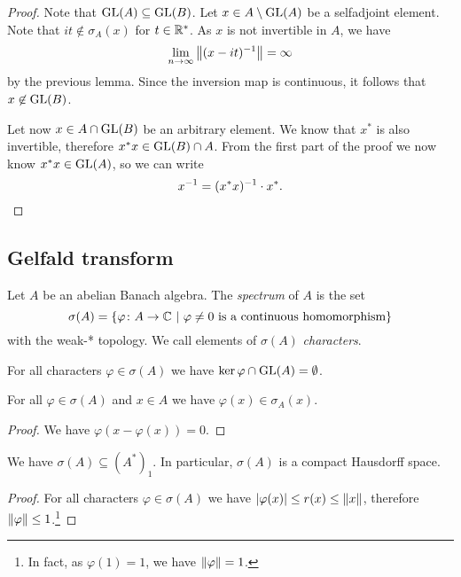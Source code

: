 \begin{proof}
Note that $\operatorname{GL}(A) \subseteq \operatorname{GL}(B)$. Let $x \in A \setminus \operatorname{GL}(A)$
be a selfadjoint element. Note that $it \not \in \sigma_A(x)$ for
$t \in \mathbb{R}^*$. As $x$ is not invertible in $A$, we have
\[
\lim_{n \to \infty} \left\lVert (x - it)^{-1}\right\rVert = \infty
\]
by the previous lemma. Since the inversion map is continuous, it
follows that $x \not \in \operatorname{GL}(B)$.

Let now $x \in A \cap \operatorname{GL}(B)$ be an arbitrary element. We know that
$x^*$ is also invertible, therefore $x^* x \in \operatorname{GL}(B) \cap A$. From
the first part of the proof we now know $x^* x \in \operatorname{GL}(A)$, so
we can write
\[
x^{-1} = (x^* x)^{-1} \cdot x^*. \qedhere
\]
\end{proof}

\newpage

\subsection{Gelfald transform}

\begin{definicija}
Let $A$ be an abelian Banach algebra. The
\emph{spectrum} of $A$ is the set
\[
\sigma(A) =
\left\{\varphi \colon A \to \mathbb{C}~\middle\vert~\text{$\varphi \ne 0$ is a continuous homomorphism}\right\}
\]
with the weak-* topology. We call elements of $\sigma(A)$
\emph{characters}.
\end{definicija}

\begin{opomba}
For all characters $\varphi \in \sigma(A)$ we have
$\ker \varphi \cap \operatorname{GL}(A) = \emptyset$.
\end{opomba}

\begin{trditev}
For all $\varphi \in \sigma(A)$ and $x \in A$ we have
$\varphi(x) \in \sigma_A(x)$.
\end{trditev}

\begin{proof}
We have $\varphi(x - \varphi(x)) = 0$.
\end{proof}

\begin{posledica}
We have $\sigma(A) \subseteq (A^*)_1$. In particular, $\sigma(A)$
is a compact Hausdorff space.
\end{posledica}

\begin{proof}
For all characters $\varphi \in \sigma(A)$ we have
$\left\lvert \varphi(x)\right\rvert \leq r(x) \leq \left\lVert x\right\rVert$, therefore
$\left\lVert \varphi\right\rVert \leq 1$.\footnote{In fact, as $\varphi(1) = 1$, we
have $\left\lVert \varphi\right\rVert = 1$.}
\end{proof}

